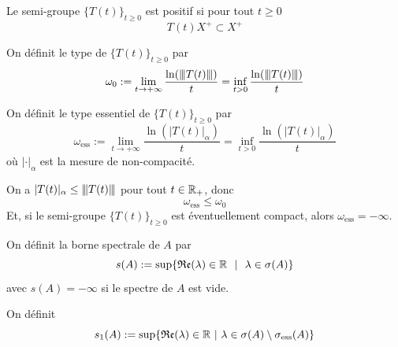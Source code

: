 \begin{definition}
    Le semi-groupe $\big\{T(t)\big\}_{t \geq 0}$ est \textcolor{astral}{positif} si pour tout $t \geq 0$ 
    \begin{equation*}
        T(t)X^+ \subset X^+
    \end{equation*}
\end{definition}

\begin{definition}
    On définit le \textcolor{astral}{type} de $\big\{T(t)\big\}_{t \geq 0}$ par 
    \begin{equation*}
        \omega_0 := \lim_{t \to +\infty}\frac{\ln({\left\vert\kern-0.25ex\left\vert \kern-0.25ex\left\vert T(t) \right\vert\kern-0.25ex\right\vert\kern-0.25ex\right\vert})}{t} = \inf_{t >0}\frac{\ln({\left\vert\kern-0.25ex\left\vert \kern-0.25ex\left\vert T(t) \right\vert\kern-0.25ex\right\vert\kern-0.25ex\right\vert})}{t}
    \end{equation*}
\end{definition}

\begin{definition}
    On définit le \textcolor{astral}{type essentiel} de $\big\{T(t)\big\}_{t \geq 0}$ par 
    \begin{equation*}
        \omega_{\text{ess}} := \lim_{t \to +\infty}\frac{\ln(|T(t)|_{\alpha})}{t} = \inf_{t >0}\frac{\ln(|T(t)|_\alpha)}{t}
    \end{equation*}
    où $|\cdot|_{\alpha}$ est la mesure de non-compacité.
\end{definition}

\begin{remark}
    On a $|T(t)|_{\alpha} \leq {\left\vert\kern-0.25ex\left\vert \kern-0.25ex\left\vert T(t) \right\vert\kern-0.25ex\right\vert\kern-0.25ex\right\vert}$ pour tout $t \in \mathbb{R}_+$, donc 
    \begin{equation*}
        \omega_{\text{ess}} \leq \omega_0
    \end{equation*}
    Et, si le semi-groupe $\big\{T(t)\big\}_{t \geq 0}$ est éventuellement compact, alors $\omega_{\text{ess}}=-\infty$.
\end{remark}

\begin{definition}
    On définit la \textcolor{astral}{borne spectrale de $A$} par 
    \begin{equation*}
        s(A):= \sup\{\Re (\lambda) \in \bbR \ \ | \ \ \lambda \in \sigma(A)\}
    \end{equation*}
    avec $s(A)=-\infty$ si le spectre de $A$ est vide.
\end{definition}

\begin{definition}
    On définit 
    \begin{equation*}
        s_1(A):=\sup\{ \mathfrak{Re}(\lambda) \in \mathbb{R} \ | \ \lambda \in \sigma(A) \setminus \sigma_{\text{ess}}(A)\}
    \end{equation*}
\end{definition}

